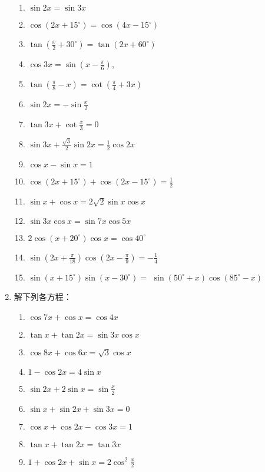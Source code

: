 \begin{enumerate}
\begin{enumerate}
\item  $\sin 2 x=\sin 3 x$
\item  $\cos \left(2 x+15^{\circ}\right)=\cos \left(4 x-15^{\circ}\right)$
\item  $\tan\left(\frac{x}{2}+30^{\circ}\right)=\tan\left(2 x+60^{\circ}\right)$
\item  $\cos 3 x=\sin \left(x-\frac{\pi}{6}\right)$,
\item  $\tan\left(\frac{\pi}{8}-x\right)=\cot\left(\frac{\pi}{4}+3 x\right)$
\item  $\sin 2 x=-\sin \frac{x}{2}$
\item  $\tan 3 x+\cot \frac{x}{3}=0$
\item  $\sin 3 x+\frac{\sqrt{3}}{2} \sin 2 x=\frac{1}{2} \cos 2 x$
\item  $\cos x-\sin x=1$
\item  $\cos \left(2 x+15^{\circ}\right)+\cos \left(2 x-15^{\circ}\right)=\frac{1}{2}$
\item  $\sin x+\cos x=2 \sqrt{2} \sin x \cos x$
\item  $\sin 3 x \cos x=\sin 7 x \cos 5 x$
\item  $2 \cos \left(x+20^{\circ}\right) \cos x=\cos 40^{\circ} $
\item $\sin \left(2 x+\frac{\pi}{18}\right) \cos \left(2 x-\frac{\pi}{9}\right)=-\frac{1}{4}$
\item  $\sin \left(x+15^{\circ}\right) \sin \left(x-30^{\circ}\right)=$ $\sin \left(50^{\circ}+x\right) \cos \left(85^{\circ}-x\right)$
\end{enumerate}

\item 解下列各方程：
\begin{multicols}{2}
    \begin{enumerate}
\item $\cos 7 x+\cos x=\cos 4 x$
\item $\tan x+\tan 2 x=\sin 3 x \cos x$
\item $\cos 8 x+\cos 6 x=\sqrt{3} \cos x$
\item  $1-\cos 2 x=4 \sin x$
\item $\sin2 x+2\sin x=\sin\frac{x}{2}$
\item $\sin x+\sin 2x+ \sin 3x= 0$
\item $\cos x+\cos2x-\cos3x=1$
\item $\tan x+\tan 2x=\tan 3x$
\item $1+\cos2x+\sin x=2\cos^2\frac{x}{2}$


\end{enumerate}
\end{multicols}
\end{enumerate}
